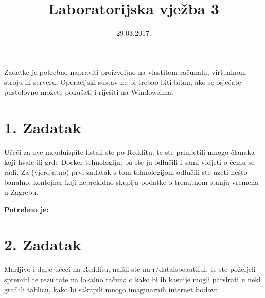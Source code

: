 \documentclass[12pt,a4paper]{article}
\begin{document}
	\title{Laboratorijska vježba 3}
	\date{\vspace{-5ex} 29.03.2017.}
	\maketitle

Zadatke je potrebno napraviti proizvoljno na vlastitom računalu, virtualnom stroju ili serveru. Operacijski sustav ne bi trebao biti bitan, ako se osjećate pustolovno možete pokušati i riješiti na Windowsima.

\section*{1. Zadatak}

Učeći za ove meuđuispite listali ste po Redditu, te ste primjetili mnogo članaka koji hvale ili grde Docker tehnologiju, pa ste ju odlučili i sami vidjeti o čemu se radi. Za (vjerojatno) prvi zadatak s tom tehnologijom odlučili ste uzeti nešto banalno: kontejner koji neprekidno skuplja podatke o trenutnom stanju vremena u Zagrebu.

\underline{\textbf{Potrebno je:}}


\newpage


\section*{2. Zadatak}

Marljivo i dalje učeći na Redditu, naišli ste na r/dataisbeautiful, te ste poželjeli spremiti te rezultate na lokalno računalo kako bi ih kasnije mogli parsirati u neki graf ili tablicu, kako bi sakupili mnogo imaginarnih internet bodova. 
\end{document}
